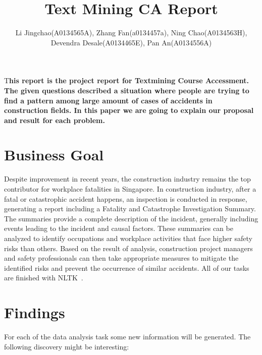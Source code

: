 \documentclass[DIV=calc, paper=a4, fontsize=11pt, twocolumn]{scrartcl}	 %
\title{\Huge Text Mining CA Report} %
\author{Li Jingchao(A0134565A), Zhang Fan(a0134457a), Ning
  Chao(A0134563H), Devendra Desale(A0134465E), Pan An(A0134556A) } %
\date{} %
\newcommand{\initial}[1]{ %
\lettrine[lines=3,lhang=0.3,nindent=0em]{
\color{DarkGoldenrod}
{\textsf{#1}}}{}}
\begin{document}
\maketitle %

\thispagestyle{fancy} %


\initial{T}\textbf{his report is the project report for Textmining
  Course Accessment.
The given questions described a situation where people are trying to
find a pattern among large amount of cases of accidents in construction
fields.
In this paper we are going to
  explain our proposal and result for  each problem.  }

\tableofcontents %


\section*{Business Goal}
Despite improvement in recent years, the construction industry remains
the top contributor for workplace fatalities in Singapore. In
construction industry, after a fatal or catastrophic accident happens,
an inspection is conducted in response, generating a report including
a Fatality and Catastrophe Investigation Summary. The summaries
provide a complete description of the incident, generally including
events leading to the incident and causal factors. These summaries can
be analyzed to identify occupations and workplace activities that face
higher safety risks than others. Based on the result of analysis,
construction project managers and safety professionals can then take
appropriate measures to mitigate the identified risks and prevent the
occurrence of similar accidents. All of our tasks are finished with
NLTK~\cite{nltk}.

\section*{Findings}
For each of the data analysis task some new information will be
generated. The following discovery might be interesting:
\end{document}
